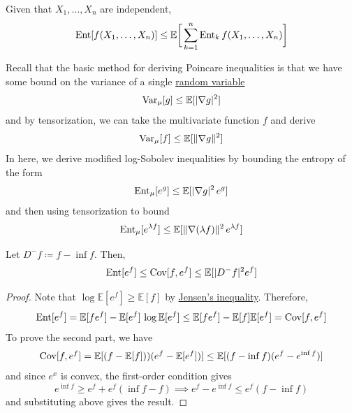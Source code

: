   \begin{theorem}
    \label{thm:tensorization-of-entropy}
  Given that $X_1, \ldots, X_n$ are independent, 
  \begin{equation}
    \operatorname{Ent}[ f(X_1, \ldots, X_n)] \leq \mathbb{E} \bigg[ \sum_{k=1}^n \operatorname{Ent}_k f (X_1, \ldots, X_n) \bigg]
  \end{equation}
  \end{theorem}

  Recall that the basic method for deriving Poincare inequalities is that we have some bound on the variance of a single \hyperref[prob-def:random-variable]{random variable} 
  \begin{equation}
    \operatorname{Var}_\mu [g] \leq \mathbb{E}[|\nabla g|^2]
  \end{equation}
  and by tensorization, we can take the multivariate function $f$ and derive 
  \begin{equation}
    \operatorname{Var}_\mu [f] \leq \mathbb{E}[ \|\nabla g\|^2 ]
  \end{equation}
  In here, we derive modified log-Sobolev inequalities by bounding the entropy of the form 
  \begin{equation}
    \operatorname{Ent}_\mu [e^g] \leq \mathbb{E}[ |\nabla g|^2 \, e^g ]
  \end{equation}
  and then using tensorization to bound 
  \begin{equation}
    \operatorname{Ent}_\mu [e^{\lambda f}] \leq \mathbb{E} [ \|\nabla (\lambda f)\|^2 \, e^{\lambda f} ]
  \end{equation}

  \begin{lemma}
    \label{thm:discrete-modified-log-sobolev}
  Let $D^- f \coloneqq f - \inf f$. Then, 
  \begin{equation}
    \operatorname{Ent}[e^f] \leq \operatorname{Cov}[f, e^f] \leq \mathbb{E}[|D^- f|^2 e^f]
  \end{equation}
  \end{lemma}
  \begin{proof}
  Note that $\log \mathbb{E}[e^f] \geq \mathbb{E}[f]$ by \hyperref[thm:jensens-inequality]{Jensen's inequality}. Therefore, 
  \begin{equation}
    \operatorname{Ent}[e^f] = \mathbb{E}[f e^f] - \mathbb{E}[e^f] \, \log \mathbb{E}[e^f] \leq \mathbb{E}[f e^f] - \mathbb{E}[f] \mathbb{E}[e^f] = \operatorname{Cov}[f, e^f]
  \end{equation}
  To prove the second part, we have 
  \begin{equation}
    \operatorname{Cov}[f, e^f] = \mathbb{E}[(f - \mathbb{E}[f]))(e^f - \mathbb{E}[e^f])] \leq \mathbb{E}[(f - \inf f)(e^f - e^{\inf f})]
  \end{equation}
  and since $e^x$ is convex, the first-order condition gives 
  \begin{equation}
    e^{\inf f} \geq e^f + e^f (\inf f - f) \implies e^f - e^{\inf f} \leq e^f (f - \inf f)
  \end{equation}
  and substituting above gives the result. 
  \end{proof}

